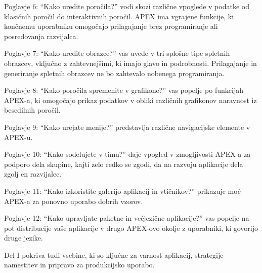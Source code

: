 Poglavje 6: ``Kako uredite poročila?'' vodi skozi različne vpoglede v podatke od klasičnih poročil do interaktivnih poročil. APEX ima vgrajene funkcije, ki končnemu uporabniku omogočajo prilagajanje brez programiranje ali posredovanja razvijalca.

Poglavje 7: ``Kako uredite obrazce?'' vas uvede v tri splošne tipe spletnih obrazcev, vključno z zahtevnejšimi, ki imajo glavo in podrobnosti. Prilagajanje in generiranje spletnih obrazcev ne bo zahtevalo nobenega programiranja. 

Poglavje 8: ``Kako poročila spremenite v grafikone?'' vas popelje po funkcijah APEX-a, ki omogočajo prikaz podatkov v obliki različnih grafikonov naravnost iz besedilnih poročil.

Poglavje 9: ``Kako urejate menije?'' predstavlja različne navigacijske elemente v APEX-u.

Poglavje 10: ``Kako sodelujete v timu?'' daje vpogled v zmogljivosti APEX-a za podporo dela skupine, kajti zelo redko se zgodi, da na razvoju aplikacije dela zgolj en razvijalec.

Poglavje 11: ``Kako izkoristite galerijo aplikacij in vtičnikov?'' prikazuje moč APEX-a za ponovno uporabo dobrih vzorov.

Poglavje 12: ``Kako upravljate paketne in večjezične aplikacije?'' vas popelje na pot distribucije vaše aplikacije v drugo APEX-ovo okolje z uporabniki, ki govorijo druge jezike.

Del I pokriva tudi vsebine, ki so ključne za varnost aplikacij, strategije namestitev in pripravo za produkcijsko uporabo.

